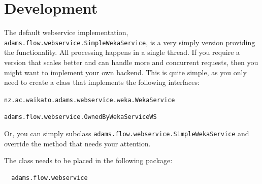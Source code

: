 \documentclass[a4paper]{book}
\begin{document}
\chapter{Development}
The default webservice implementation, \texttt{adams.flow.webservice.SimpleWekaService},
is a very simply version providing the functionality. All processing happens
in a single thread. If you require a version that scales better and can handle
more and concurrent requests, then you might want to implement your own
backend. This is quite simple, as you only need to create a class that implements
the following interfaces:
\begin{tight_itemize}
	\item \texttt{nz.ac.waikato.adams.webservice.weka.WekaService}
	\item \texttt{adams.flow.webservice.OwnedByWekaServiceWS}
\end{tight_itemize}
Or, you can simply subclass \texttt{adams.flow.webservice.SimpleWekaService}
and override the method that needs your attention.

The class needs to be placed in the following package:
\begin{verbatim}
  adams.flow.webservice
\end{verbatim}


\end{document}
